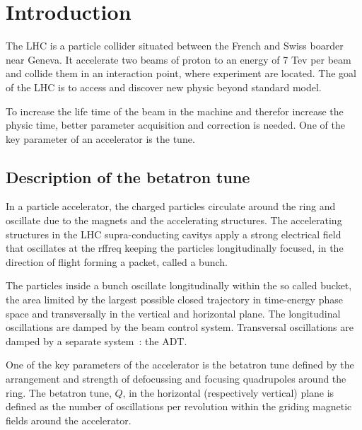 %


\chapter{Introduction}

The \gls{LHC} is a particle collider situated between the French and Swiss boarder near Geneva. It accelerate two beams of proton to an energy of 7 Tev per beam and collide them in an interaction point, where experiment are located. The goal of the \gls{LHC} is to access and discover new physic beyond standard model.

To increase the life time of the beam in the machine and therefor increase the physic time, better parameter acquisition and correction is needed. One of the key parameter of an accelerator is the \gls{tune}.

\section{Description of the betatron tune}

In a particle accelerator, the charged particles circulate around the ring and oscillate due to the magnets and the accelerating structures. The accelerating structures in the \gls{LHC} supra-conducting \glspl{cavity} apply a strong electrical field that oscillates at the \gls{rffreq} keeping the particles longitudinally focused, in the direction of flight forming a packet, called a \gls{bunch}.

The particles inside a bunch oscillate longitudinally within the so called bucket, the area limited by the largest possible closed trajectory in time-energy phase space and transversally in the vertical and horizontal plane. The longitudinal oscillations are damped by the beam control system. Transversal oscillations are damped by a separate system~: the \gls{ADT}\cite{Zhabitsky:1141925,Benews11}.

One of the key parameters of the accelerator is the betatron tune defined by the arrangement and strength of defocussing and focusing quadrupoles around the ring. The betatron tune, $Q$, in the horizontal (respectively vertical) plane is defined as the number of oscillations per revolution within the griding magnetic fields around the accelerator.

